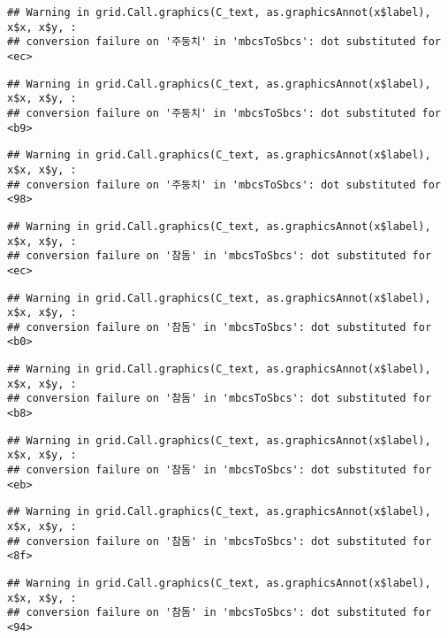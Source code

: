 \documentclass[
]{article}
\begin{document}
\begin{verbatim}
## Warning in grid.Call.graphics(C_text, as.graphicsAnnot(x$label), x$x, x$y, :
## conversion failure on '주둥치' in 'mbcsToSbcs': dot substituted for <ec>
\end{verbatim}

\begin{verbatim}
## Warning in grid.Call.graphics(C_text, as.graphicsAnnot(x$label), x$x, x$y, :
## conversion failure on '주둥치' in 'mbcsToSbcs': dot substituted for <b9>
\end{verbatim}

\begin{verbatim}
## Warning in grid.Call.graphics(C_text, as.graphicsAnnot(x$label), x$x, x$y, :
## conversion failure on '주둥치' in 'mbcsToSbcs': dot substituted for <98>
\end{verbatim}

\begin{verbatim}
## Warning in grid.Call.graphics(C_text, as.graphicsAnnot(x$label), x$x, x$y, :
## conversion failure on '참돔' in 'mbcsToSbcs': dot substituted for <ec>
\end{verbatim}

\begin{verbatim}
## Warning in grid.Call.graphics(C_text, as.graphicsAnnot(x$label), x$x, x$y, :
## conversion failure on '참돔' in 'mbcsToSbcs': dot substituted for <b0>
\end{verbatim}

\begin{verbatim}
## Warning in grid.Call.graphics(C_text, as.graphicsAnnot(x$label), x$x, x$y, :
## conversion failure on '참돔' in 'mbcsToSbcs': dot substituted for <b8>
\end{verbatim}

\begin{verbatim}
## Warning in grid.Call.graphics(C_text, as.graphicsAnnot(x$label), x$x, x$y, :
## conversion failure on '참돔' in 'mbcsToSbcs': dot substituted for <eb>
\end{verbatim}

\begin{verbatim}
## Warning in grid.Call.graphics(C_text, as.graphicsAnnot(x$label), x$x, x$y, :
## conversion failure on '참돔' in 'mbcsToSbcs': dot substituted for <8f>
\end{verbatim}

\begin{verbatim}
## Warning in grid.Call.graphics(C_text, as.graphicsAnnot(x$label), x$x, x$y, :
## conversion failure on '참돔' in 'mbcsToSbcs': dot substituted for <94>
\end{verbatim}
\end{document}
